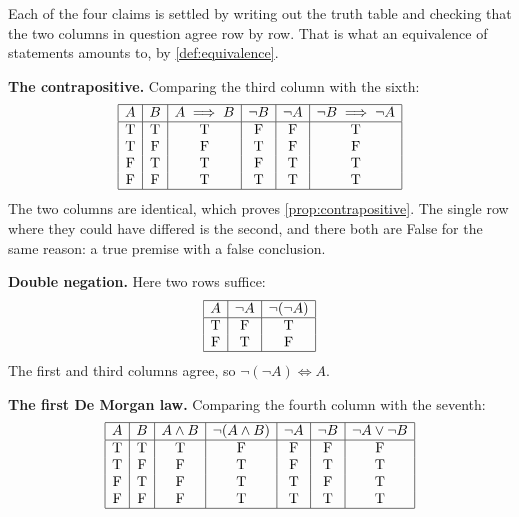 \begin{exercisesolution}
\label{sol:contrapositive}
Each of the four claims is settled by writing out the truth table and checking that the two columns in question agree row by row. That is what an equivalence of statements amounts to, by \cref{def:equivalence}.

\textbf{The contrapositive.} Comparing the third column with the sixth:
\[
\begin{array}{|c|c|c|c|c|c|}
\hline
A & B & A \implies B & \neg B & \neg A & \neg B \implies \neg A \\
\hline
\text{T} & \text{T} & \text{T} & \text{F} & \text{F} & \text{T} \\
\text{T} & \text{F} & \text{F} & \text{T} & \text{F} & \text{F} \\
\text{F} & \text{T} & \text{T} & \text{F} & \text{T} & \text{T} \\
\text{F} & \text{F} & \text{T} & \text{T} & \text{T} & \text{T} \\
\hline
\end{array}
\]
The two columns are identical, which proves \cref{prop:contrapositive}. The single row where they could have differed is the second, and there both are False for the same reason: a true premise with a false conclusion.

\textbf{Double negation.} Here two rows suffice:
\[
\begin{array}{|c|c|c|}
\hline
A & \neg A & \neg(\neg A) \\
\hline
\text{T} & \text{F} & \text{T} \\
\text{F} & \text{T} & \text{F} \\
\hline
\end{array}
\]
The first and third columns agree, so $\neg(\neg A) \iff A$.

\textbf{The first De Morgan law.} Comparing the fourth column with the seventh:
\[
\begin{array}{|c|c|c|c|c|c|c|}
\hline
A & B & A \wedge B & \neg(A \wedge B) & \neg A & \neg B & \neg A \vee \neg B \\
\hline
\text{T} & \text{T} & \text{T} & \text{F} & \text{F} & \text{F} & \text{F} \\
\text{T} & \text{F} & \text{F} & \text{T} & \text{F} & \text{T} & \text{T} \\
\text{F} & \text{T} & \text{F} & \text{T} & \text{T} & \text{F} & \text{T} \\
\text{F} & \text{F} & \text{F} & \text{T} & \text{T} & \text{T} & \text{T} \\
\hline
\end{array}
\]


\end{exercisesolution}
